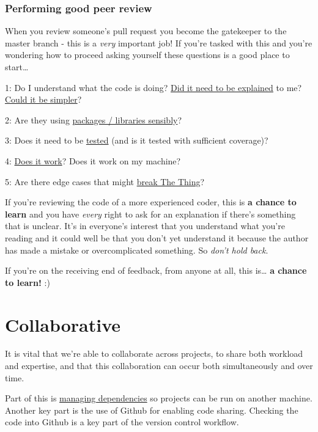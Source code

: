 \documentclass[]{book}
\begin{document}
\hypertarget{performing-good-peer-review}{%
\subsubsection*{Performing good peer review}\label{performing-good-peer-review}}

When you review someone's pull request you become the gatekeeper to the master branch - this is a \emph{very} important job! If you're tasked with this and you're wondering how to proceed asking yourself these questions is a good place to start\ldots{}

1: Do I understand what the code is doing? \protect\hyperlink{users}{Did it need to be explained} to me? \protect\hyperlink{ccc}{Could it be simpler}?

2: Are they using \protect\hyperlink{defaults}{packages / libraries sensibly}?

3: Does it need to be \protect\hyperlink{ccc}{tested} (and is it tested with sufficient coverage)?

4: \protect\hyperlink{ccc}{Does it work}? Does it work on my machine?

5: Are there edge cases that might \protect\hyperlink{errors}{break The Thing}?

If you're reviewing the code of a more experienced coder, this is \textbf{a chance to learn} and you have \emph{every} right to ask for an explanation if there's something that is unclear. It's in everyone's interest that you understand what you're reading and it could well be that you don't yet understand it because the author has made a mistake or overcomplicated something. So \emph{don't hold back}.

If you're on the receiving end of feedback, from anyone at all, this is\ldots{} \textbf{a chance to learn!} :)

\hypertarget{collaborate}{%
\section{Collaborative}\label{collaborate}}

It is vital that we're able to collaborate across projects, to share both workload and expertise, and that this collaboration can occur both simultaneously and over time.

Part of this is \protect\hyperlink{projdep}{managing dependencies} so projects can be run on another machine. Another key part is the use of Github for enabling code sharing. Checking the code into Github is a key part of the version control workflow.
\end{document}
